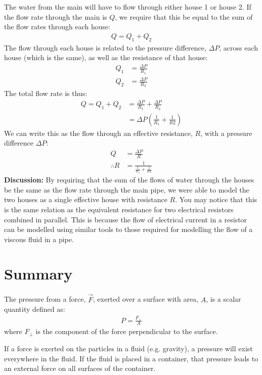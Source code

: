 {{\begin{example}
The water from the main will have to flow through either house 1 or house 2. If the flow rate through the main is $Q$, we require that this be equal to the sum of the flow rates through each house:
\begin{align*}
Q = Q_1 + Q_2
\end{align*}
The flow through each house is related to the pressure difference, $\Delta P$, across each house (which is the same), as well as the resistance of that house:
\begin{align*}
Q_1 &= \frac{\Delta P}{R_1}\\
Q_2 &= \frac{\Delta P}{R_2}
\end{align*}
The total flow rate is thus:
\begin{align*}
Q = Q_1 + Q_2&=\frac{\Delta P}{R_1}+\frac{\Delta P}{R_2}\\
&=\Delta P \left(\frac{1}{R_1}+\frac{1}{R2}\right)
\end{align*}
We can write this as the flow through an effective resistance, $R$, with a pressure difference $\Delta P$:
\begin{align*}
Q &= \frac{\Delta P}{R}\\
\therefore R&= \frac{1}{\frac{1}{R_1}+\frac{1}{R2}}
\end{align*}
\textbf{Discussion: }By requiring that the sum of the flows of water through the houses be the same as the flow rate through the main pipe, we were able to model the two houses as a single effective house with resistance $R$. You may notice that this is the same relation as the equivalent resistance for two electrical resistors combined in parallel. This is because the flow of electrical current in a resistor can be modelled using similar tools to those required for modelling the flow of a viscous fluid in a pipe. 
\end{example}
\newpage
\section{Summary}
\vspace{-0.4cm}
\begin{chapterSummary}
The pressure from a force, $\vec F$, exerted over a surface with area, $A$, is a scalar quantity defined as:
\begin{align*}
P = \frac{F_\perp}{A}
\end{align*}
where $F_\perp$ is the component of the force perpendicular to the surface.

If a force is exerted on the particles in a fluid (e.g. gravity), a pressure will exist everywhere in the fluid. If the fluid is placed in a container, that pressure leads to an external force on all surfaces of the container. 


\end{chapterSummary}}}
